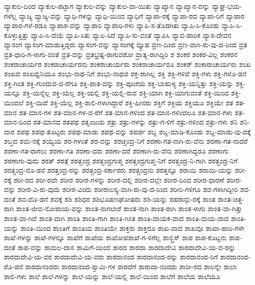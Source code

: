 {ವ್ಯಾಕುಲ-ದಿಂದ
ವ್ಯಾಕುಲ-ಪಟ್ಟಾಗ
ವ್ಯಾಕುಲ-ವನ್ನು
ವ್ಯಾಕುಲ-ವಾ-ಯಿತು
ವ್ಯಾಖ್ಯಾನ
ವ್ಯಾಖ್ಯಾನ-ವನ್ನು
ವ್ಯಾಘ್ರ-ಭಯ-ಗಳೆಲ್ಲ
ವ್ಯಾಜ್ಯ
ವ್ಯಾಜ್ಯ-ವನ್ನು
ವ್ಯಾಧಿ-ಗಳನ್ನು
ವ್ಯಾಧಿ-ಯಿಂದ
ವ್ಯಾಧಿಗೆ
ವ್ಯಾಪಾ-ರಕ್ಕೆ
ವ್ಯಾಪಾ-ರದ
ವ್ಯಾಪಾ-ರಿಗೆ
ವ್ಯಾಪಾರ
ವ್ಯಾಪಾರ-ಗಳೆ-ರಡೂ
ವ್ಯಾಪಾರ-ವನ್ನು
ವ್ಯಾಪಾರಿ
ವ್ಯಾಪಾರಿ-ಗಳು
ವ್ಯಾಪಿ-ಸ-ತೊಡಗಿತು
ವ್ಯಾಪಿ-ಸಿ-ಕೊಂಡು
ವ್ಯಾಪಿ-ಸಿ-ಕೊಳ್ಳುತ್ತಿತ್ತು
ವ್ಯಾಪಿ-ಸಿ-ದೆಯೆ
ವ್ಯಾಪಿ-ಸಿತು
ವ್ಯಾಪಿ-ಸಿದೆ
ವ್ಯಾಪಿ-ಸು-ವಂತೆ
ವ್ಯಾಪಿಸಿ
ವ್ಯಾವ-ಹಾರಿಕ
ವ್ಯಾಸ-ದೇವನ
ವ್ಯಾಸಂಗ
ವ್ಯಾಸಂಗ-ಮಾಡುತ್ತಿದ್ದರು
ವ್ಯಾಸಂಗ-ವನ್ನು
ವ್ಯಾಸಂಗಕ್ಕೆ
ವ್ಯೂಹ
ವ್ರಣ-ದಿಂದ
ವ್ರಣ-ವಾಗಿ-ರು-ವು-ದ-ರಿಂದ
ವ್ರತ
ವ್ರತ-ಧಾರಿ-ಗ-ಳಾಗು-ವಂತೆ
ವ್ರತ-ವನ್ನು
ವ್ರತಭ್ರಷ್ಟ-ರಾಗುವರೋ
ವ್ರಾತ್ಯ-ರಾಗಿದ್ದಿರಿ
ಶ
ಶಂಕರ
ಶಂಕರ-ವಿಲ್ಲ
ಶಂಕರನ
ಶಂಕರಾಚಾರ್ಯರ
ಶಂಕರಾಚಾರ್ಯರನು
ಶಂಕರಾಚಾರ್ಯರು
ಶಂಕರಾಚಾರ್ಯರೂ
ಶಂಕರ್
ಶಂಕಾರಾಚಾರ್ಯರು
ಶಂಖ
ಶಂಖದ
ಶಂಖಧ್ವನಿಯೂ
ಶಂಭು-ನಾಥ-ನಿಗೆ
ಶಂಭು-ನಾಥಜಿ
ಶಕ್ತ-ರಾಗಿಲ್ಲ
ಶಕ್ತಿ
ಶಕ್ತಿ-ಗಳಿವೆ
ಶಕ್ತಿ-ಗಳು
ಶಕ್ತಿ-ಗಳೊ-ಡನೆ
ಶಕ್ತಿ-ಗಿಂತ
ಶಕ್ತಿ-ಗುಂದುವ-ವ-ರೆಗೂ
ಶಕ್ತಿ-ಪಾತ-ವನ್ನು
ಶಕ್ತಿ-ಪೂಜೆಯ
ಶಕ್ತಿ-ಬಾಹುಳ್ಯ
ಶಕ್ತಿ-ಯನ್ನಿತ್ತು
ಶಕ್ತಿ-ಯನ್ನು
ಶಕ್ತಿ-ಯನ್ನೂ
ಶಕ್ತಿ-ಯನ್ನೆಲ್ಲ
ಶಕ್ತಿ-ಯಲ್ಲ
ಶಕ್ತಿ-ಯಲ್ಲಿ
ಶಕ್ತಿ-ಯಲ್ಲಿ-ರುವ
ಶಕ್ತಿ-ಯಾಗಿ
ಶಕ್ತಿ-ಯಾಗುವಂತೆ
ಶಕ್ತಿ-ಯಿಂದ
ಶಕ್ತಿ-ಯಿಂದಲೆ
ಶಕ್ತಿ-ಯಿದೆ
ಶಕ್ತಿ-ಯೆಲ್ಲ
ಶಕ್ತಿ-ಶಾಲಿ-ಗಳಾಗಿದ್ದಾರೆ
ಶಕ್ತಿ-ಹೀನರು
ಶಕ್ತಿಗೆ
ಶಕ್ತಿಯ
ಶಕ್ತಿಯೂ
ಶಕ್ತಿಯೇ
ಶತ
ಶತ-ಮಾನ
ಶತ-ಮಾನ-ಗಳ
ಶತ-ಮಾನ-ಗಳ-ವ-ರೆಗೆ
ಶತ-ಮಾನ-ಗಳಿಂದ
ಶತ-ಮಾನ-ಗಳಿಂದಲೂ
ಶತ-ಮಾನ-ಗಳು
ಶತ-ಮಾನ-ದಿಂದ
ಶತ-ಮಾನದ
ಶತಪಥ
ಶತೃಂಜಯ
ಶತ್ರು
ಶತ್ರು-ಗಳನ್ನು
ಶತ್ರು-ಗ-ಳಿಗೆ
ಶತ್ರು-ಗಳಿಂದ
ಶತ್ರು-ಗಳು
ಶನಿ
ಶನಿ-ವಾರ
ಶಪಥ
ಶಪಥ-ತೊಟ್ಟರು
ಶಪಥ-ಮಾಡು
ಶಪಥ-ವನ್ನು
ಶಪರ್ಡ
ಶಬ್ದ
ಶಬ್ದ-ಮಾಡಿ-ಕೊಂಡು
ಶಬ್ದ-ಮಾಡು-ವು-ದಕ್ಕೆ
ಶಬ್ಧದ
ಶಮ-ನಕ್ಕೆ
ಶಯ್ಯೆಯ
ಶರ-ಗಳಂತೆ
ಶರ-ವನ್ನು
ಶರಚ್ಚಂದ್ರ-ನಿಗೆ
ಶರಣಾ-ಗತ-ನಾಗಿ-ರು-ವೆನು
ಶರಣಾ-ಗತ-ನಾದರೆ
ಶರಣಾ-ಗತ-ರಾಗಲು
ಶರಣಾ-ಗತಿ
ಶರಣಾ-ದರು
ಶರಣಾ-ದರೆ
ಶರಣಾಗಿ-ರು-ವೆನು
ಶರಣಾಗಿದ್ದರೂ
ಶರಣಾಗು
ಶರಣಾಗು-ವುದು
ಶರತ್
ಶರತ್ಗೆ
ಶರತ್ಚಂದ್ರ
ಶರತ್ಚಂದ್ರಗುಪ್ತ
ಶರತ್ಚಂದ್ರಗುಪ್ತ-ನಿಗೆ
ಶರತ್ಚಂದ್ರ-ನಿ-ಗಾಗಿ
ಶರತ್ಚಂದ್ರ-ನಿಗೆ
ಶರತ್ಚಂದ್ರ-ನೊ-ಡನೆ
ಶರತ್ಚಂದ್ರ-ರನ್ನು
ಶರತ್ಚಂದ್ರ-ಸರ್ಕಾರರು
ಶರತ್ಚಂದ್ರನು
ಶರತ್ತನ್ನೂ
ಶರಾಯಿ
ಶರಾಯಿ-ಯನ್ನು
ಶರೀ-ರಕ್ಕೆ
ಶರೀ-ರದ
ಶರೀ-ರವೇ
ಶರೀರ
ಶರೀರ-ಗಳನ್ನು
ಶರೀರ-ದಲ್ಲಿ
ಶರೀರ-ದಲ್ಲೇ
ಶರೀರ-ದಿಂದ
ಶರೀರ-ಧಾರಣೆ
ಶರೀರ-ವನ್ನು
ಶರೀರ-ವಿ-ರು-ವುದು
ಶರೀರ-ವಿಂದು
ಶರೀರಾಲಸ್ಯ-ವಾಗಿ-ರು-ವು-ದ-ರಿಂದ
ಶರೀರಿ-ಗಳಿಗೂ
ಶವ-ಗಳಾಗಿದ್ದೀರಿ
ಶವ-ದಂತೆ
ಶವ-ದೊ-ಡನೆ
ಶವಕ್ಕೆ
ಶಶಿ
ಶಶಿಧರ
ಶಶಿಭೂಷಣಘೋಷರು
ಶಶಿ-ಯನ್ನು
ಶಹರಾನ್ಪು-ರಕ್ಕೆ
ಶಾಂತ
ಶಾಂತ-ಚಿತ್ತ-ರಾಗಿ
ಶಾಂತ-ಜೀವ-ನೋಪಾಯ-ವನ್ನು
ಶಾಂತ-ನಾಗಲಾರೆ
ಶಾಂತ-ನಾಗಿ
ಶಾಂತ-ರಾಗಿ
ಶಾಂತ-ಳಾಗು
ಶಾಂತ-ವಾ-ಗಿತ್ತು
ಶಾಂತ-ವಾ-ಗಿದೆ
ಶಾಂತ-ವಾಗಿ
ಶಾಂತಿ
ಶಾಂತಿ-ಗಾಗಿ
ಶಾಂತಿ-ಗಿಂತ
ಶಾಂತಿ-ದಾಯಕ-ವಾದ
ಶಾಂತಿ-ಮಯ-ವಾದ
ಶಾಂತಿ-ಯನ್ನು
ಶಾಂತಿ-ಯಿಂದ
ಶಾಂತಿಗೆ
ಶಾಂತಿಯ
ಶಾಂತಿಯೇ
ಶಾಕ್ತರು
ಶಾಕ್ತರೂ
ಶಾಖ-ವಾದ
ಶಾಖವೂ
ಶಾಖಾ-ಹಾರಿ-ಗಳೇ
ಶಾಖೆ-ಗಳನ್ನು
ಶಾಖೆ-ಗಳನ್ನೂ
ಶಾಖೆಗೆ
ಶಾಖೆಯ
ಶಾಖೋಪಶಾಖೆ-ಗ-ಳಿಗೆಲ್ಲ
ಶಾನ್ಬ್ರಸ್
ಶಾಪ
ಶಾಪ-ಕೊಟ್ಟನು
ಶಾಪ-ದಂತೆ
ಶಾಪ-ವನ್ನು
ಶಾಮಲ-ದಾಸ
ಶಾಮಿಗೆ-ಯಿಂದ
ಶಾರದ
ಶಾರದಾ
ಶಾರದಾದೇವಿ
ಶಾರದಾದೇವಿ-ಯ-ವ-ರನ್ನು
ಶಾರದಾದೇವಿ-ಯ-ವರ
ಶಾರದಾದೇವಿ-ಯ-ವರು
ಶಾರದಾನಂದ
ಶಾರದಾನಂದ-ರನ್ನು
ಶಾರದಾನಂದ-ರಿಗೆ
ಶಾರದಾನಂದ-ರೊ-ಡನೆ
ಶಾರದಾನಂದರು
ಶಾರದಾನಂದ-ಸ್ವಾಮಿ-ಗಳ
ಶಾರದೆಗೆ
ಶಾರಾದಾ-ನಂದರು
ಶಾರೀ-ರದ
ಶಾಲನ್ನೇ
ಶಾಲಾ
ಶಾಲಿ-ಗಳು
ಶಾಲೆ
ಶಾಲೆ-ಗಳನ್ನು
ಶಾಲೆ-ಯನ್ನು
ಶಾಲೆ-ಯಲ್ಲಿ
ಶಾಲೆ-ಯಿಂದ
ಶಾಲೆಗೆ
ಶಾಲೆಯ
ಶಾಲೆಯೂ
}
